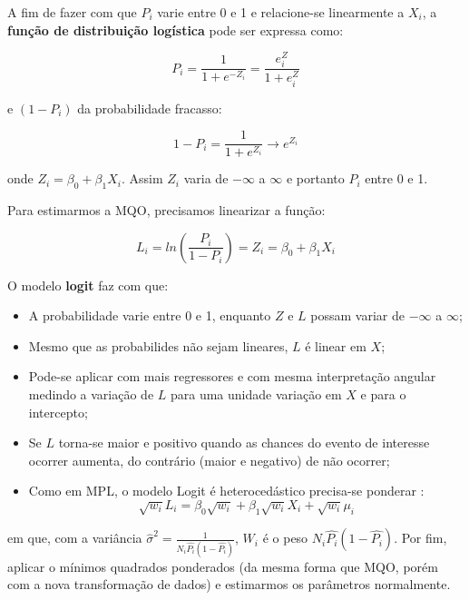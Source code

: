 \documentclass[
  openany]{book}
\begin{document}
A fim de fazer com que \(P_i\) varie entre 0 e 1 e relacione-se linearmente a \(X_i\), a \textbf{função de distribuição logística} pode ser expressa como:

\begin{equation}
    P_i=\frac{1}{1+e^{-Z_i}}=\frac{e^Z_i}{1+e^Z_i}
    \label{eq:logitpi}
\end{equation}

e \((1-P_i)\) da probabilidade fracasso:

\begin{equation}
    1-P_i=\frac{1}{1+e^{Z_i}}\rightarrow e^{Z_i}
    \label{eq:logitmenospi}
\end{equation}

onde \(Z_i=\beta_0+\beta_1X_i\). Assim \(Z_i\) varia de \(-\infty\) a \(\infty\) e portanto \(P_i\) entre 0 e 1.

Para estimarmos a MQO, precisamos linearizar a função:

\begin{equation}
    L_i=ln(\frac{P_i}{1-P_i})=Z_i=\beta_0+\beta_1 X_i
    \label{eq:logitlinear}
\end{equation}

O modelo \textbf{logit} faz com que:

\begin{itemize}
\item
  A probabilidade varie entre 0 e 1, enquanto \(Z\) e \(L\) possam variar de \(-\infty\) a \(\infty\);
\item
  Mesmo que as probabilides não sejam lineares, \(L\) é linear em \(X\);
\item
  Pode-se aplicar com mais regressores e com mesma interpretação angular medindo a variação de \(L\) para uma unidade variação em \(X\) e para o intercepto;
\item
  Se \(L\) torna-se maior e positivo quando as chances do evento de interesse ocorrer aumenta, do contrário (maior e negativo) de não ocorrer;
\item
  Como em MPL, o modelo Logit é heterocedástico precisa-se ponderar \citep{gujarati2011econometria, cox1970analysis}:
  \begin{equation}
    \sqrt{w_i}L_i=\beta_0 \sqrt{w_i}+\beta_1\sqrt{w_i}X_i+\sqrt{w_i}\mu_i 
    \label{eq:mqplogit}
  \end{equation}
\end{itemize}

em que, com a variância \(\hat{\sigma}^2=\frac{1}{N_i\hat{P_i}(1-\hat{P_i})}\), \(W_i\) é o peso \(N_i\hat{P_i}(1-\hat{P_i})\). Por fim, aplicar o mínimos quadrados ponderados (da mesma forma que MQO, porém com a nova transformação de dados) e estimarmos os parâmetros normalmente.
\end{document}
